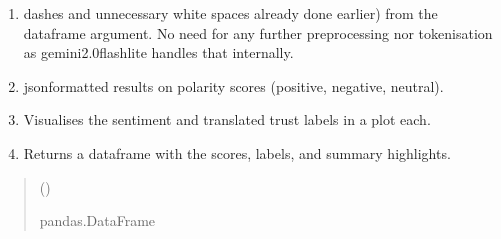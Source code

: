 \documentclass[letterpaper,10pt,english]{sphinxhowto}
\begin{document}
\begin{fulllineitems}
\label{\detokenize{_autosummary/custom_packages.modelling_modules.nlp_modelling.sentiment_analysis_using_google:custom_packages.modelling_modules.nlp_modelling.sentiment_analysis_using_google}}
\pysigstartsignatures
\pysiglinewithargsret
{}
{}
{}
\pysigstopsignatures\begin{enumerate}
%
\item {} \begin{description}
\sphinxAtStartPar
dashes and unnecessary white spaces already done earlier) from the dataframe argument. No need for any further
preprocessing nor tokenisation as gemini\sphinxhyphen{}2.0\sphinxhyphen{}flash\sphinxhyphen{}lite handles that internally.

\end{description}

\item {} \begin{description}
\sphinxAtStartPar
json\sphinxhyphen{}formatted results on polarity scores (positive, negative, neutral).

\end{description}

\item {} 
\sphinxAtStartPar
Visualises the sentiment and translated trust labels in a plot each.

\item {} 
\sphinxAtStartPar
Returns a dataframe with the scores, labels, and summary highlights.

\end{enumerate}
\begin{quote}\begin{description}
\sphinxAtStartPar
{} ()

\sphinxAtStartPar
pandas.DataFrame

\end{description}\end{quote}

\end{fulllineitems}
\end{document}
